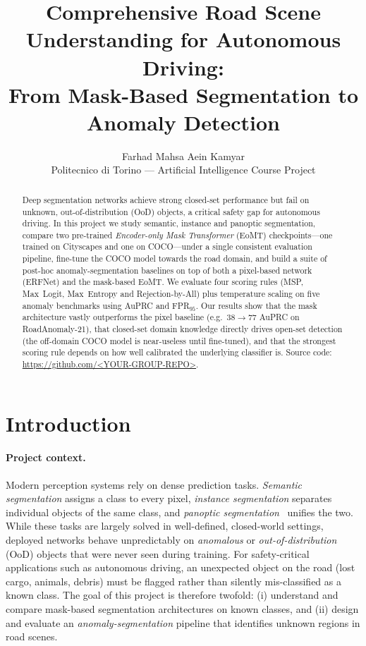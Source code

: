 \documentclass[10pt,twocolumn]{article}
\title{\vspace{-1.0cm}\textbf{Comprehensive Road Scene Understanding for Autonomous Driving:\\
From Mask-Based Segmentation to Anomaly Detection}}
\author{Farhad \quad Mahsa \quad Aein \quad Kamyar\\
\small Politecnico di Torino --- Artificial Intelligence Course Project}
\date{}
\begin{document}
\maketitle

\begin{abstract}
\small
Deep segmentation networks achieve strong closed-set performance but fail on
unknown, out-of-distribution (OoD) objects, a critical safety gap for
autonomous driving. In this project we study semantic, instance and panoptic
segmentation, compare two pre-trained \emph{Encoder-only Mask Transformer}
(EoMT) checkpoints---one trained on Cityscapes and one on COCO---under a single
consistent evaluation pipeline, fine-tune the COCO model towards the road
domain, and build a suite of post-hoc anomaly-segmentation baselines on top of
both a pixel-based network (ERFNet) and the mask-based EoMT. We evaluate four
scoring rules (MSP, Max~Logit, Max~Entropy and Rejection-by-All) plus
temperature scaling on five anomaly benchmarks using AuPRC and FPR$_{95}$. Our
results show that the mask architecture vastly outperforms the pixel baseline
(e.g.\ $38\!\rightarrow\!77$ AuPRC on RoadAnomaly-21), that closed-set domain
knowledge directly drives open-set detection (the off-domain COCO model is
near-useless until fine-tuned), and that the strongest scoring rule depends on
how well calibrated the underlying classifier is. Source code:
\url{https://github.com/<YOUR-GROUP-REPO>}.
\end{abstract}

\section{Introduction}

\paragraph{Project context.}
Modern perception systems rely on dense prediction tasks.
\emph{Semantic segmentation} assigns a class to every pixel,
\emph{instance segmentation} separates individual objects of the same class,
and \emph{panoptic segmentation}~\cite{kirillov2019panoptic} unifies the two.
While these tasks are largely solved in well-defined, closed-world settings,
deployed networks behave unpredictably on \emph{anomalous} or
\emph{out-of-distribution} (OoD) objects that were never seen during
training. For safety-critical applications such as autonomous driving, an
unexpected object on the road (lost cargo, animals, debris) must be flagged
rather than silently mis-classified as a known class. The goal of this project
is therefore twofold: (i) understand and compare mask-based segmentation
architectures on known classes, and (ii) design and evaluate an
\emph{anomaly-segmentation} pipeline that identifies unknown regions in road
scenes.
\end{document}
